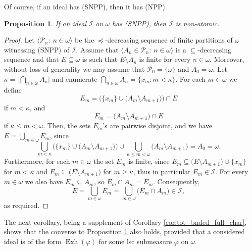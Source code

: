 \documentclass[a4paper,11pt,fleqn]{amsart}
\newtheorem{proposition}[theorem]{Proposition}
\theoremstyle{definition}
\theoremstyle{remark}
\numberwithin{equation}{section}
\newcommand{\N}{\mathbb{N}}
\newcommand{\iI}{\mathcal{I}}
\newcommand{\pP}{\mathcal{P}}
\DeclareMathOperator{\exh}{Exh}
\newcommand{\sub}{\subseteq}
\newcommand{\seqn}[1]{\big\langle#1\colon\ n\io\big\rangle}
\newcommand{\io}{\in\omega}%
\begin{document}
Of course, if an ideal has (SNPP), then it has (NPP).%

\begin{proposition}\label{prop:snpp_nonatomic}
If an ideal $\iI$ on $\omega$ has (SNPP), then $\iI$ is non-atomic.
\end{proposition}
\begin{proof}
Let $\seqn{\pP_n}$ be the $\preceq$-decreasing sequence of finite partitions of $\omega$ witnessing (SNPP) of $\iI$. Assume that $\seqn{A_n\in\pP_n}$ is a $\subseteq$-decreasing sequence and that $E\sub\omega$ is such that $E\setminus A_n$ is finite for every $n\io$. Moreover, without loss of generality we may assume that $\pP_0=\{\omega\}$ and $A_0=\omega$. Let $\kappa=\Big|\bigcap_{n\io}A_n\Big|$ and enumerate $\bigcap_{n\io}A_n=\big\{x_m\colon m<\kappa\big\}$. For each $m\io$ we define
\[E_m = \Big(\big\{x_m\big\}\cup\big(A_m\setminus A_{m+1}\big)\Big)\cap E\]
if $m<\kappa$, and
\[E_m = \big(A_m\setminus A_{m+1}\big)\cap E\]
if $\kappa\le m<\omega$. Then, the sets $E_m$'s are pairwise disjoint, and we have $E=\bigcup_{m\io}E_m$, since
\[\bigcup_{m<\kappa}\Big(\big\{x_m\big\}\cup\big(A_m\setminus A_{m+1}\big)\Big)\cup\bigcup_{\kappa\le m<\omega}\big(A_m\setminus A_{m+1}\big)=A_0=\omega.\]
Furthermore, for each $m\io$ the set $E_m$ is finite, since $E_m\sub\big(E\setminus A_{m+1}\big)\cup\big\{x_m\big\}$ for $m<\kappa$ and $E_m\sub\big(E\setminus A_{m+1}\big)$ for $m\ge\kappa$, thus in particular $E_m\in\iI$. For every $m\io$ we also have $E_m\sub A_m$, so $E_m\cap A_m=E_m$. Consequently, 
\[E=\bigcup_{m\io}E_m=\bigcup_{m\io}\big(E_m\cap A_m\big)\in\iI,\]
as required.
\end{proof}

The next corollary, being a supplement of Corollary \ref{cor:tot_bnded_full_char}, shows that the converse to Proposition \ref{prop:snpp_nonatomic} also holds, provided that a considered ideal is of the form $\exh(\varphi)$ for some lsc submeasure $\varphi$ on $\omega$.
\end{document}
